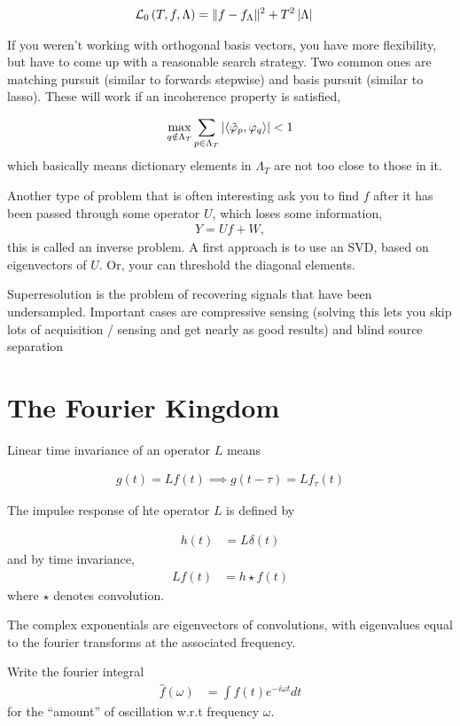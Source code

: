 \documentclass{article}
\begin{document}
\begin{align}
\mathcal{L}_{0}\left(T, f, \Lambda\right) &= \|f - f_{\Lambda}\|^{2} + T^{2}\left|\Lambda\right|
\end{align}

If you weren't working with orthogonal basis vectors, you have more flexibility,
but have to come up with a reasonable search strategy. Two common ones are
matching pursuit (similar to forwards stepwise) and basis pursuit (similar to
lasso). These will work if an incoherence property is satisfied,

\begin{align}
\max_{q \notin \Lambda_{T}} \sum_{p \in \Lambda_{T}} \left|\left<\tilde{\varphi}_p, \varphi_q\right>\right| < 1
\end{align}
which basically means dictionary elements in $\Lambda_{T}$ are not too close to
those in it.

Another type of problem that is often interesting ask you to find $f$ after it
has been passed through some operator $U$, which loses some information,
\begin{align}
Y = U f + W,
\end{align}
this is called an inverse problem. A first approach is to use an SVD, based on
eigenvectors of $U$. Or, your can threshold the diagonal elements.

Superresolution is the problem of recovering signals that have been
undersampled. Important cases are compressive sensing (solving this lets you
skip lots of acquisition / sensing and get nearly as good results) and blind
source separation

\section{The Fourier Kingdom}
\label{sec:chapter_2}

Linear time invariance of an operator $L$ means

\begin{align}
g\left(t\right) = Lf\left(t\right) \implies g\left(t - \tau\right) = L f_{\tau}\left(t\right)
\end{align}

The impulse response of hte operator $L$ is defined by

\begin{align}
h\left(t\right) &= L \delta\left(t\right)
\end{align}
and by time invariance,
\begin{align}
Lf\left(t\right) &= h\star f\left(t\right)
\end{align}
where $\star$ denotes convolution.

The complex exponentials are eigenvectors of convolutions, with eigenvalues
equal to the fourier transforms at the associated frequency.

Write the fourier integral
\begin{align}
\hat{f}\left(\omega\right) &= \int f\left(t\right) e^{-i\omega t} dt
\end{align}
for the ``amount'' of oscillation w.r.t frequency $\omega$.
\end{document}
